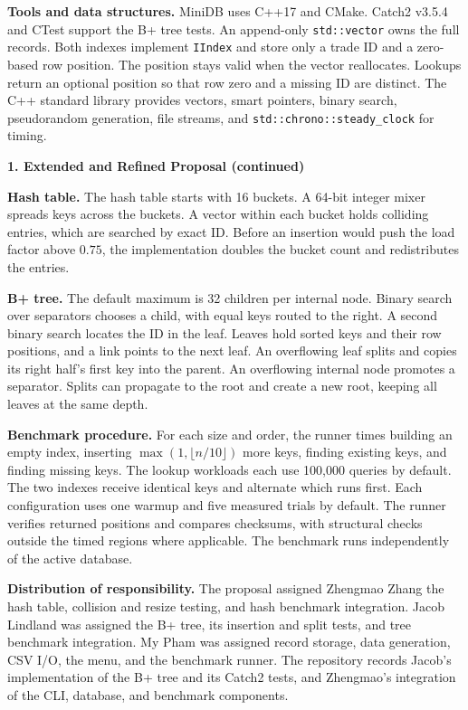 \documentclass[12pt,letterpaper]{article}
\newcommand{\heading}[1]{\par\addvspace{10pt}\noindent\textbf{#1}\par\nobreak}
\begin{document}
\textbf{Tools and data structures.}
MiniDB uses C++17 and CMake. Catch2 v3.5.4 and CTest support the B+ tree
tests. An append-only \texttt{std::vector} owns the full records. Both indexes
implement \texttt{IIndex} and store only a trade ID and a zero-based row position.
The position stays valid when the vector reallocates. Lookups return an optional
position so that row zero and a missing ID are distinct. The C++ standard library
provides vectors, smart pointers, binary search, pseudorandom generation, file
streams, and \texttt{std::chrono::steady\_clock} for timing.

\newpage
\heading{1. Extended and Refined Proposal (continued)}

\textbf{Hash table.}
The hash table starts with 16 buckets. A 64-bit integer mixer spreads keys across
the buckets. A vector within each bucket holds colliding entries, which are
searched by exact ID. Before an insertion would push the load factor above
$0.75$, the implementation doubles the bucket count and redistributes the entries.

\textbf{B+ tree.}
The default maximum is 32 children per internal node. Binary search over
separators chooses a child, with equal keys routed to the right. A second binary
search locates the ID in the leaf. Leaves hold sorted keys and their row positions,
and a link points to the next leaf. An overflowing leaf splits and copies its
right half's first key into the parent. An overflowing internal node promotes a
separator. Splits can propagate to the root and create a new root, keeping all
leaves at the same depth.

\textbf{Benchmark procedure.}
For each size and order, the runner times building an empty index, inserting
$\max(1,\lfloor n/10\rfloor)$ more keys, finding existing keys, and finding missing
keys. The lookup workloads each use 100,000 queries by default. The two indexes
receive identical keys and alternate which runs first. Each configuration uses
one warmup and five measured trials by default. The runner verifies returned
positions and compares checksums, with structural checks outside the timed
regions where applicable. The benchmark runs independently of the active database.

\textbf{Distribution of responsibility.}
The proposal assigned Zhengmao Zhang the hash table, collision and resize
testing, and hash benchmark integration. Jacob Lindland was assigned the B+
tree, its insertion and split tests, and tree benchmark integration. My Pham
was assigned record storage, data generation, CSV I/O, the menu, and the
benchmark runner. The repository records Jacob's implementation of the B+
tree and its Catch2 tests, and Zhengmao's integration of the CLI, database,
and benchmark components.
\end{document}
